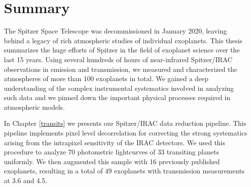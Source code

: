 
\renewcommand{\thefigure}{\Alph{figure}}

\setcounter{figure}{0}

\setcounter{footnote}{0}

\cleardoublepage

\chapter{Summary}

The Spitzer Space Telescope was decommissioned in January 2020, leaving behind a legacy of rich atmospheric studies of individual exoplanets. This thesis summarizes the huge efforts of Spitzer in the field of exoplanet science over the last 15 years. Using several hundreds of hours of near-infrared Spitzer/IRAC observations in emission and transmission, we measured and characterized the atmospheres of more than 100 exoplanets in total. We gained a deep understanding of the complex instrumental systematics involved in analyzing such data and we pinned down the important physical processes required in atmospheric models.

In Chapter \ref{transits} we presents our Spitzer/IRAC data reduction pipeline. This pipeline implements pixel level decorrelation for correcting the strong systematics arising from the intrapixel sensitivity of the IRAC detectors. We used this procedure to analyze 70 photometric lightcurves of 33 transiting planets uniformly. We then augmented this sample with 16 previously published exoplanets, resulting in a total of 49 exoplanets with transmission measurements at 3.6 and 4.5\um.

